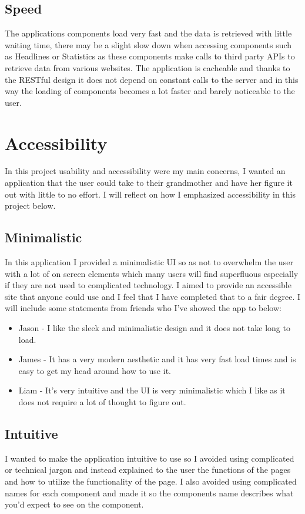 \subsection{Speed}
The applications components load very fast and the data is retrieved with little waiting time, there may be a slight slow down when accessing components such as Headlines or Statistics as these components make calls to third party APIs to retrieve data from various websites.  The application is cacheable and thanks to the RESTful design it does not depend on constant calls to the server and in this way the loading of components becomes a lot faster and barely noticeable to the user.
\section{Accessibility}
In this project usability and accessibility were my main concerns, I wanted an application that the user could take to their grandmother and have her figure it out with little to no effort.  I will reflect on how I emphasized accessibility in this project below.
\subsection{Minimalistic}
In this application I provided a minimalistic UI so as not to overwhelm the user
with a lot of on screen elements which many users will find superfluous especially
if they are not used to complicated technology.  I aimed to provide an accessible
site that anyone could use and I feel that I have completed that to a fair degree.
I will include some statements from friends who I've showed the app to below:
\begin{itemize}
\item Jason - I like the sleek and minimalistic design and it does not take long to load.
\item James - It has a very modern aesthetic and it has very fast load times and is easy to get my head around how to use it.
\item Liam - It's very intuitive and the UI is very minimalistic which I like as it does not require a lot of thought to figure out.
\end{itemize}
\subsection{Intuitive}
I wanted to make the application intuitive to use so I avoided using complicated or technical jargon and instead explained to the user the functions of the pages and how to utilize the functionality of the page.  I also avoided using complicated names for each component and made it so the components name describes what you'd expect to see on the component.
